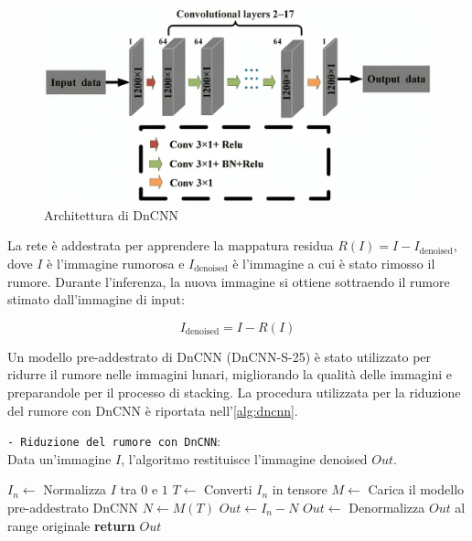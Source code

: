 \begin{figure}[H]
    \centering
    \includegraphics[scale=0.3]{../assets/dncnn.png}
    \captionsetup{justification=centering}
    \caption{Architettura di DnCNN \cite{dncnn_img}} \label{fig:dncnn}
\end{figure}

La rete è addestrata per apprendere la mappatura residua $R(I) = I - I_{\text{denoised}}$, dove $I$ è l'immagine rumorosa e $I_{\text{denoised}}$ è l'immagine a cui è stato rimosso il rumore. Durante l'inferenza, la nuova immagine si ottiene sottraendo il rumore stimato dall'immagine di input:

$$I_{\text{denoised}} = I - R(I)$$

Un modello pre-addestrato di DnCNN (DnCNN-S-25) è stato utilizzato per ridurre il rumore nelle immagini lunari, migliorando la qualità delle immagini e preparandole per il processo di stacking. La procedura utilizzata per la riduzione del rumore con DnCNN è riportata nell'\cref{alg:dncnn}.

\begin{algorithm}[H]
    \caption{\texttt{- Riduzione del rumore con DnCNN}:\\ Data un'immagine $I$, l'algoritmo restituisce l'immagine denoised $Out$.} \label{alg:dncnn}
    \begin{algorithmic}[1]
            \State $I_n \gets$ Normalizza $I$ tra $0$ e $1$ 
            \State $T \gets$ Converti $I_n$ in tensore
            \State $M \gets$ Carica il modello pre-addestrato DnCNN
            \State $N \gets M(T)$ 
            \State $Out \gets I_n - N$ 
            \State $Out \gets$ Denormalizza $Out$ al range originale
            \State \textbf{return} $Out$
        \EndFunction
    \end{algorithmic}
\end{algorithm}


